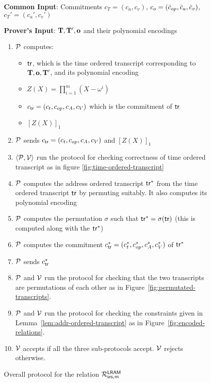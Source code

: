 \begin{figure}[htbp]

    \begin{mdframed}
    {
            {\bf Common Input}: Commitments $c_T=(c_a,c_v)$, $c_o=(\bar{c}_{op}, \bar{c}_a, \bar{c}_v)$, $c_T'=(c_a', c_v')$

            {\bf Prover's Input}: $ \mathbf{T}, \mathbf{T}', \mathbf{o}$ and their polynomial encodings
        \begin{enumerate}[leftmargin=1em, label=\arabic*.]
            \item $\mathcal{P}$ computes:
            \begin{itemize}
                \item $\mathsf{tr}$, which is the time ordered transcript corresponding to $\mathbf{T}, \mathbf{o}, \mathbf{T}'$, and its polynomial encoding
                \item $Z(X)=\prod_{i=1}^m (X-\omega^i)$
                \item $c_{\mathsf{tr}}=(c_t, c_{op}, c_A, c_V)$ which is the commitment of $\mathsf{tr}$
                \item $[Z(X)]_1$
            \end{itemize}

            \item $\mathcal{P}$ sends  $c_{\mathsf{tr}}=(c_t, c_{op}, c_A, c_V)$ and $[Z(X)]_1$
            \item $\left<\mathcal{P}, \mathcal{V} \right>$ run the protocol for checking correctness of time ordered transcript as in figure \ref{fig:time-ordered-transcript}
            \item $\mathcal{P}$ computes the address ordered transcript $\mathsf{tr}^{*}$ from the time ordered transcript $\mathsf{tr}$ by permuting suitably. It also computes its polynomial encoding
            \item $\mathcal{P}$ computes the permutation $\sigma$ such that $\mathsf{tr}^{*}= \sigma(\mathsf{tr})$ (this is computed along with the $\mathsf{tr}^{*}$)
            \item $\mathcal{P}$ computes the commitment $c_{\mathsf{tr}}^\ast=(c_t^\ast,c_{op}^\ast, c_A^\ast, c_V^\ast)$ of $\mathsf{tr}^{*}$
            \item $\mathcal{P}$ sends  $c_{\mathsf{tr}}^\ast$
            \item $\mathcal{P}$ and $\mathcal{V}$ run the protocol for checking that the two transcripts are permutations of each other
            as in Figure~\ref{fig:permutated-transcripts}.
            \item $\mathcal{P}$ and $\mathcal{V}$ run  the protocol for checking the constraints given in Lemma~\ref{lem:addr-ordered-transcript}
            as in Figure~\ref{fig:encoded-relations}.
            \item $\mathcal{V}$ accepts if all the three sub-protocols accept. $\mathcal{V}$ rejects otherwise.
        \end{enumerate}
    }
    \end{mdframed}
    \caption{Overall protocol for the relation $\mathcal{R}^{\mathsf{LRAM}}_{\mathsf{srs},m}$}
    \label{fig:covering-protocol}
\end{figure}

